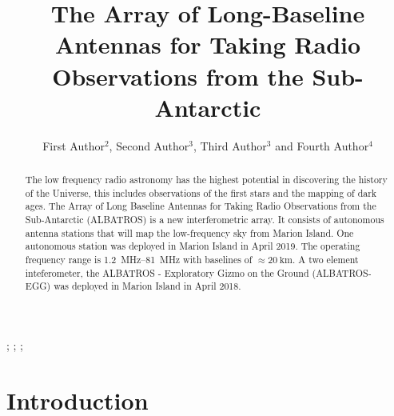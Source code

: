 \documentclass{ws-jai}
\begin{document}
\catchline{}{}{}{}{} %


\title{The Array of Long-Baseline Antennas for Taking Radio
  Observations from the Sub-Antarctic}

\author{First Author$^{2}$, Second Author$^{3}$, Third Author$^{3}$ and Fourth Author$^{4}$}

\address{
$^{2}$Department, University Name, City, State ZIP/Zone, Country, fauthor@university.com\\
$^{3}$Group, Company, Address, City, State ZIP/Zone, Country\\
$^{4}$Group, Company, Address, City, State ZIP/Zone, Country, fauthor@company.com
}

\maketitle


\begin{history}
;
;
;
\end{history}

\begin{abstract}
The low frequency radio astronomy has the highest potential in discovering the history of the Universe, this includes observations of the first stars and the mapping of dark ages. The Array of Long Baseline Antennas for Taking Radio Observations from the Sub-Antarctic (ALBATROS) is a new interferometric array. It consists of autonomous antenna stations that will map the low-frequency sky from Marion Island. One autonomous station was deployed in Marion Island in April 2019. The operating frequency range is \SIrange{1.2}{81}{\MHz} with baselines of $\approx \SI{20}{\km}$. A two element inteferometer, the ALBATROS - Exploratory Gizmo on the Ground (ALBATROS-EGG) was deployed in Marion Island in April 2018. \\
\end{abstract}


\section{Introduction}
\end{document}
